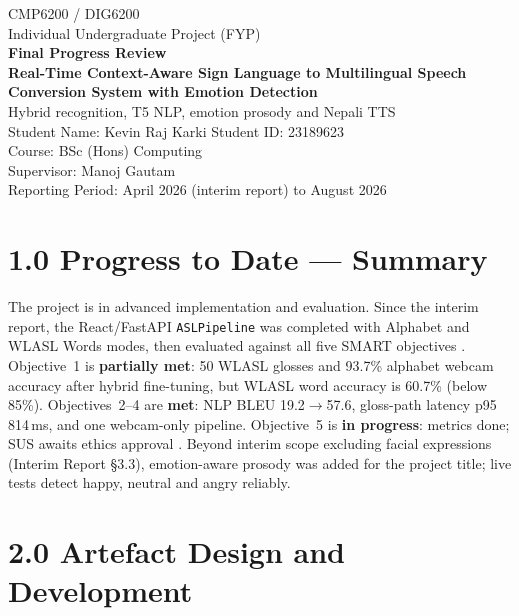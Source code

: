 \documentclass[11pt,a4paper]{article}
\begin{document}
\begin{titlepage}
\centering
\vspace*{1.2cm}
{\large CMP6200 / DIG6200}\\[0.3em]
{\large Individual Undergraduate Project (FYP)}\\[1em]
{\LARGE\textbf{Final Progress Review}}\\[0.8em]
{\large\textbf{Real-Time Context-Aware Sign Language to Multilingual Speech}}\\
{\large\textbf{Conversion System with Emotion Detection}}\\[0.4em]
{\normalsize Hybrid recognition, T5 NLP, emotion prosody and Nepali TTS}\\[1.5em]
{\large Student Name: Kevin Raj Karki \quad Student ID: 23189623}\\[0.3em]
{\large Course: BSc (Hons) Computing}\\[0.3em]
{\large Supervisor: Manoj Gautam}\\[1.2em]
{\large Reporting Period: April 2026 (interim report) to August 2026}
\vfill
\end{titlepage}

\newpage
\tableofcontents
\newpage

\section{1.0 Progress to Date --- Summary}

The project is in advanced implementation and evaluation.
Since the interim report, the React/FastAPI \texttt{ASLPipeline} was completed with Alphabet and WLASL Words modes, then evaluated against all five SMART objectives \citep{li2020wlasl,raffel2020t5}.
Objective~1 is \textbf{partially met}: 50 WLASL glosses and 93.7\% alphabet webcam accuracy after hybrid fine-tuning, but WLASL word accuracy is 60.7\% (below 85\%).
Objectives~2--4 are \textbf{met}: NLP BLEU 19.2$\rightarrow$57.6, gloss-path latency p95 814\,ms, and one webcam-only pipeline.
Objective~5 is \textbf{in progress}: metrics done; SUS awaits ethics approval \citep{brooke1996sus}.
Beyond interim scope excluding facial expressions (Interim Report \S3.3), emotion-aware prosody was added for the project title; live tests detect happy, neutral and angry reliably.

\section{2.0 Artefact Design and Development}
\end{document}
